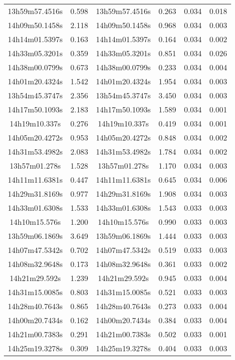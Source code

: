 \begin{table}
\begin{tabular}{cccccc}
13h59m57.4516s & 0.598 & 13h59m57.4516s & 0.263 & 0.034 & 0.018 \\
14h09m50.1458s & 2.118 & 14h09m50.1458s & 0.968 & 0.034 & 0.003 \\
14h14m01.5397s & 0.163 & 14h14m01.5397s & 0.164 & 0.034 & 0.002 \\
14h33m05.3201s & 0.359 & 14h33m05.3201s & 0.851 & 0.034 & 0.026 \\
14h38m00.0799s & 0.673 & 14h38m00.0799s & 0.233 & 0.034 & 0.004 \\
14h01m20.4324s & 1.542 & 14h01m20.4324s & 1.954 & 0.034 & 0.003 \\
13h54m45.3747s & 2.356 & 13h54m45.3747s & 3.450 & 0.034 & 0.003 \\
14h17m50.1093s & 2.183 & 14h17m50.1093s & 1.589 & 0.034 & 0.001 \\
14h19m10.337s & 0.276 & 14h19m10.337s & 0.419 & 0.034 & 0.001 \\
14h05m20.4272s & 0.953 & 14h05m20.4272s & 0.848 & 0.034 & 0.002 \\
14h31m53.4982s & 2.083 & 14h31m53.4982s & 1.784 & 0.034 & 0.002 \\
13h57m01.278s & 1.528 & 13h57m01.278s & 1.170 & 0.034 & 0.003 \\
14h11m11.6381s & 0.447 & 14h11m11.6381s & 0.645 & 0.034 & 0.006 \\
14h29m31.8169s & 0.977 & 14h29m31.8169s & 1.908 & 0.034 & 0.003 \\
14h33m01.6308s & 1.533 & 14h33m01.6308s & 1.543 & 0.033 & 0.003 \\
14h10m15.576s & 1.200 & 14h10m15.576s & 0.990 & 0.033 & 0.003 \\
13h59m06.1869s & 3.649 & 13h59m06.1869s & 1.444 & 0.033 & 0.003 \\
14h07m47.5342s & 0.702 & 14h07m47.5342s & 0.519 & 0.033 & 0.003 \\
14h08m32.9648s & 0.173 & 14h08m32.9648s & 0.361 & 0.033 & 0.002 \\
14h21m29.592s & 1.239 & 14h21m29.592s & 0.945 & 0.033 & 0.004 \\
14h31m15.0085s & 0.803 & 14h31m15.0085s & 0.521 & 0.033 & 0.003 \\
14h28m40.7643s & 0.865 & 14h28m40.7643s & 0.273 & 0.033 & 0.004 \\
14h00m20.7434s & 0.162 & 14h00m20.7434s & 0.384 & 0.033 & 0.004 \\
14h21m00.7383s & 0.291 & 14h21m00.7383s & 0.502 & 0.033 & 0.001 \\
14h25m19.3278s & 0.309 & 14h25m19.3278s & 0.404 & 0.033 & 0.003 \\

\end{tabular}
\end{table}
